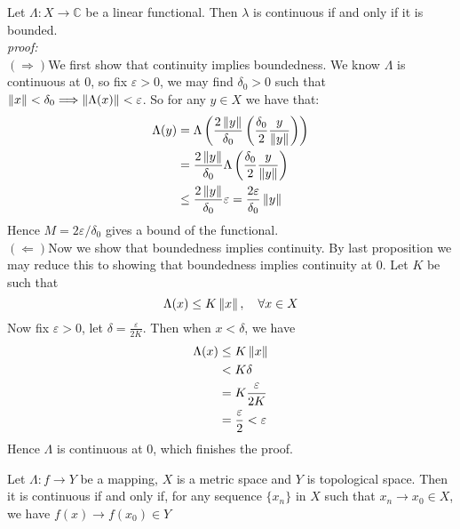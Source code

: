 \begin{proposition}\rm\nextline
	Let $\Lambda:X\xrightarrow{}\mathbb{C}$ be a linear functional. Then $\lambda$ is continuous if and only if it is bounded.\\
	\textit{proof:}\\
	$(\Longrightarrow)$We first show that continuity implies boundedness. We know $\Lambda$ is continuous at 0, so fix $\varepsilon>0$, we may find $\delta_0>0$ such that $\left\|{x}\right\|<\delta_0\Longrightarrow \left\|{\Lambda(x)}\right\|<\varepsilon$. So for any $y\in X$ we have that:
	\begin{equation}
		\begin{split}
			\Lambda(y)&=\Lambda\left(\frac{2\left\|{y}\right\|}{\delta_0}\left(\frac{\delta_0}{2}\frac{y}{\left\|{y}\right\|}\right)\right)\\
			&=\frac{2\left\|{y}\right\|}{\delta_0}\Lambda\left(\frac{\delta_0}{2}\frac{y}{\left\|{y}\right\|}\right)\\
			&\leq\frac{2\left\|{y}\right\|}{\delta_0}\varepsilon=\frac{2\varepsilon}{\delta_0}\left\|{y}\right\|
		\end{split}
	\end{equation}
	Hence $M=2\varepsilon/\delta_0$ gives a bound of the functional.\\
	$(\Longleftarrow)$Now we show that boundedness implies continuity. By last proposition we may reduce this to showing that boundedness implies continuity at 0. Let $K$ be such that
	$$
		\Lambda(x) \leq K\left\|{x}\right\|,\quad\forall x\in X
	$$
	Now fix $\varepsilon>0$, let $\delta=\frac{\varepsilon}{2K}$. Then when $x<\delta$, we have
	\begin{equation}
		\begin{split}
			\Lambda(x)&\leq K\left\|{x}\right\|\\
			&< K \delta\\
			&= K \frac{\varepsilon}{2K}\\&
			=\frac{\varepsilon}{2}<\varepsilon\\
		\end{split}
	\end{equation}
	Hence $\Lambda$ is continuous at 0, which finishes the proof.
\end{proposition}

\begin{proposition}\rm
	Let $\Lambda:f\xrightarrow{}Y$ be a mapping, $X$ is a metric space and $Y$ is topological space. Then it is continuous if and only if, for any sequence $\{x_n\}$ in $X$ such that $x_n\longrightarrow{}x_0\in X$, we have $f(x)\longrightarrow{}f(x_0)\in Y$
\end{proposition}


